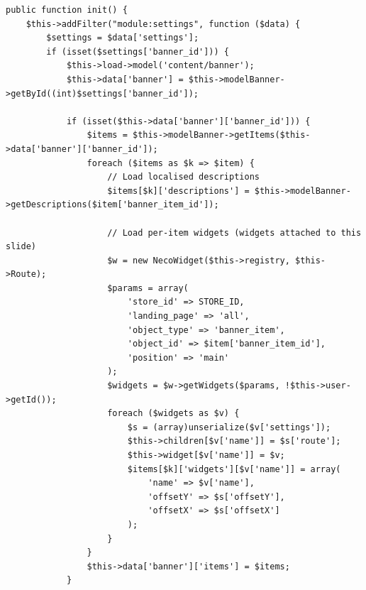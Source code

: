 \documentclass[11pt,a4paper]{article}
\begin{document}
\begin{lstlisting}[caption={\texttt{ControllerModuleBanner::init()} --- the module:settings filter (abridged).},label={lst:banner-widget}]
public function init() {
    $this->addFilter("module:settings", function ($data) {
        $settings = $data['settings'];
        if (isset($settings['banner_id'])) {
            $this->load->model('content/banner');
            $this->data['banner'] = $this->modelBanner->getById((int)$settings['banner_id']);

            if (isset($this->data['banner']['banner_id'])) {
                $items = $this->modelBanner->getItems($this->data['banner']['banner_id']);
                foreach ($items as $k => $item) {
                    // Load localised descriptions
                    $items[$k]['descriptions'] = $this->modelBanner->getDescriptions($item['banner_item_id']);

                    // Load per-item widgets (widgets attached to this slide)
                    $w = new NecoWidget($this->registry, $this->Route);
                    $params = array(
                        'store_id' => STORE_ID,
                        'landing_page' => 'all',
                        'object_type' => 'banner_item',
                        'object_id' => $item['banner_item_id'],
                        'position' => 'main'
                    );
                    $widgets = $w->getWidgets($params, !$this->user->getId());
                    foreach ($widgets as $v) {
                        $s = (array)unserialize($v['settings']);
                        $this->children[$v['name']] = $s['route'];
                        $this->widget[$v['name']] = $v;
                        $items[$k]['widgets'][$v['name']] = array(
                            'name' => $v['name'],
                            'offsetY' => $s['offsetY'],
                            'offsetX' => $s['offsetX']
                        );
                    }
                }
                $this->data['banner']['items'] = $items;
            }


\end{lstlisting}
\end{document}
